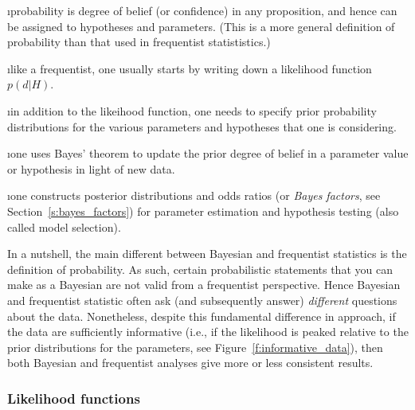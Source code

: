 \ei


\bi

\i probability is degree of belief (or confidence)
in any proposition, and hence can be assigned to 
hypotheses and parameters.
(This is a more general definition of probability than 
that used in frequentist statististics.)

\i like a frequentist, one usually starts by writing 
down a likelihood function $p(d|H)$.

\i in addition to the likeihood function, one needs to
specify prior probability distributions for the various 
parameters and hypotheses that one is considering.

\i one uses Bayes' theorem to update the prior degree 
of belief in a parameter value or hypothesis in light 
of new data.

\i one constructs posterior distributions and odds 
ratios (or {\em Bayes factors}, see Section~\ref{s:bayes_factors}) 
for parameter estimation and hypothesis testing (also 
called model selection).

\ei
\noindent
In a nutshell, the main different between Bayesian and 
frequentist statistics is the definition of probability.
As such, certain probabilistic statements that you can
make as a Bayesian are not valid from a frequentist perspective.
Hence Bayesian and frequentist statistic often ask 
(and subsequently answer) {\em different} questions 
about the data.
Nonetheless, despite this fundamental difference in approach,
if the data are sufficiently informative (i.e., if the 
likelihood is peaked relative to the prior distributions 
for the parameters, see Figure~\ref{f:informative_data}), 
then both Bayesian and frequentist analyses give more or 
less consistent results.

\subsubsection{Likelihood functions}
\label{s:likelihood}


